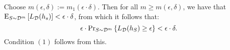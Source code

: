 Choose $m(\epsilon, \delta) := m_1(\epsilon \cdot \delta)$. Then for all $m
\geq m(\epsilon, \delta)$, we have that $\text{E}_{S \sim
\mathcal{D}^m} \left [ L_{\mathcal{D}}(h_s) \right ] < \epsilon \cdot \delta$, from which it follows that:
\[
    \epsilon \cdot  \text{Pr}_{S \sim \mathcal{D}^{m}} \left \{ L_{\mathcal{D}} (h_S) \geq \epsilon \right \} < 
        \epsilon \cdot \delta. \]
Condition $(1)$ follows from this.  
